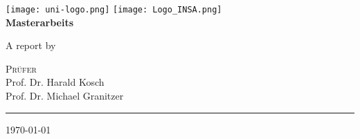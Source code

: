 \begin{titlepage}
    \centering
    \begin{onehalfspace}
    	
		\texttt{[image: uni-logo.png]}
		\hspace*{1.0cm}
		\texttt{[image: Logo\_INSA.png]}\\
		\vspace{1.0cm}
        	{\Large \bfseries Masterarbeits }\\

        	\vspace{2.5cm}

            \begin{doublespace}
            	{\textsf{\Huge{\thetitle}}}
            \end{doublespace}

        	\vspace{2cm}

            {\Large A report by}\\

        	\vspace{1cm}

        	{\bfseries \large{\theauthor}}

        	\vfill

        	{\Large
                \textsc{Pr\"ufer} \\
				Prof. Dr. Harald Kosch \\
                Prof. Dr. Michael Granitzer\\
        	}

        	\vspace{1.5cm}

        	\parbox{\linewidth}{\hrule\strut}

            \vfill

			{\large \today}
    \end{onehalfspace}
\end{titlepage}
